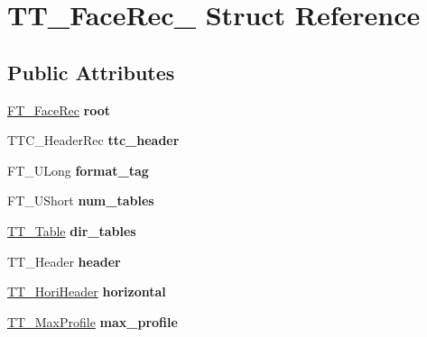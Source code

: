 \hypertarget{struct_t_t___face_rec__}{}\section{T\+T\+\_\+\+Face\+Rec\+\_\+ Struct Reference}
\label{struct_t_t___face_rec__}
\subsection*{Public Attributes}
\begin{DoxyCompactItemize}
\item 
\mbox{\label{struct_t_t___face_rec___ab07a1f6ce2cffe73a5501fb33164ae74}} 
\hyperlink{struct_f_t___face_rec__}{F\+T\+\_\+\+Face\+Rec} {\bfseries root}
\item 
\mbox{\label{struct_t_t___face_rec___a9cde4ce9550411379eef0791afef8943}} 
T\+T\+C\+\_\+\+Header\+Rec {\bfseries ttc\+\_\+header}
\item 
\mbox{\label{struct_t_t___face_rec___ae492c009d7c3dd1b7279f6596edb84af}} 
F\+T\+\_\+\+U\+Long {\bfseries format\+\_\+tag}
\item 
\mbox{\label{struct_t_t___face_rec___aa32df24e9bbbbc72117bfeb964028b6e}} 
F\+T\+\_\+\+U\+Short {\bfseries num\+\_\+tables}
\item 
\mbox{\label{struct_t_t___face_rec___ae4480c53c6414c74919fc99c9192adfe}} 
\hyperlink{struct_t_t___table_rec__}{T\+T\+\_\+\+Table} {\bfseries dir\+\_\+tables}
\item 
\mbox{\label{struct_t_t___face_rec___ac5fc04850d7b223029891601ed605b34}} 
T\+T\+\_\+\+Header {\bfseries header}
\item 
\mbox{\label{struct_t_t___face_rec___a784d2ca39e9717da0661f5fd59dffc58}} 
\hyperlink{struct_t_t___hori_header__}{T\+T\+\_\+\+Hori\+Header} {\bfseries horizontal}
\item 
\mbox{\label{struct_t_t___face_rec___a1bacbea2875d5fda567a5f561773035d}} 
\hyperlink{struct_t_t___max_profile__}{T\+T\+\_\+\+Max\+Profile} {\bfseries max\+\_\+profile}

\end{DoxyCompactItemize}
